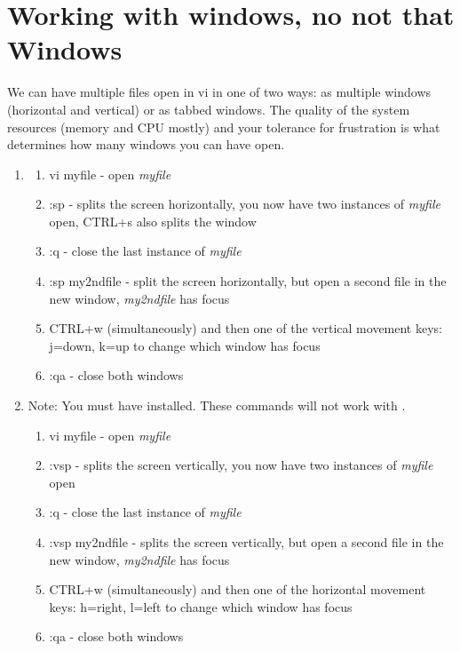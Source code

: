 \section{Working with windows, no not that Windows}
We can have multiple files open in vi in one of two ways: as multiple windows (horizontal and vertical) or as tabbed windows. The quality of the system resources (memory and CPU mostly) and your tolerance for frustration is what determines how many windows you can have open.

\begin{enumerate}
	\item {}
	\begin{enumerate}
		\item vi myfile - open \textsl{myfile}
		\item :sp - splits the screen horizontally, you now have two instances of \textsl{myfile} open, CTRL+s also splits the window
		\item :q - close the last instance of \textsl{myfile}
		\item :sp my2ndfile - split the screen horizontally, but open a second file in the new window, \textsl{my2ndfile} has focus
		\item CTRL+w (simultaneously) and then one of the vertical movement keys: j=down, k=up to change which window has focus
		\item :qa - close both windows		
	\end{enumerate}
	
	\item {} Note: You must have  installed. These commands will not work with .
	\begin{enumerate}
		\item vi myfile - open \textsl{myfile}
		\item :vsp - splits the screen vertically, you now have two instances of \textsl{myfile} open
		\item :q - close the last instance of \textsl{myfile}
		\item :vsp my2ndfile - splits the screen vertically, but open a second file in the new window, \textsl{my2ndfile} has focus
		\item CTRL+w (simultaneously) and then one of the horizontal movement keys: h=right, l=left to change which window has focus
		\item :qa - close both windows
	\end{enumerate}
	

\end{enumerate}
